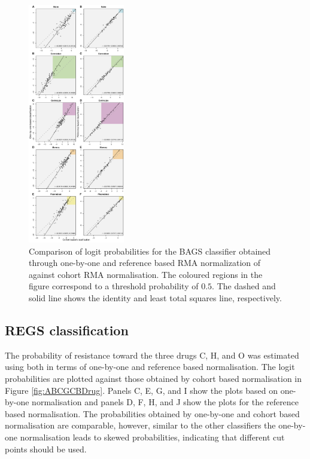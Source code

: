 \documentclass{article}
\begin{document}
\begin{figure}
\begin{center}
\includegraphics[width=0.375\textwidth]{figures/figure3.pdf}
\end{center}
\caption{Comparison of logit probabilities for the BAGS classifier obtained through one-by-one and reference based RMA normalization of \hemaClass{} against cohort RMA normalisation.
The coloured regions in the figure correspond to a threshold probability of $0.5$. The dashed and solid line shows the identity and least total squares line, respectively.}
\label{fig:Bagscorr}
\end{figure}
\newpage


\subsection{REGS classification}

The probability of resistance toward the three drugs C, H, and O was estimated using \hemaClass{} both in terms of one-by-one and reference based normalisation.
The logit probabilities are plotted against those obtained by cohort based normalisation in Figure \ref{fig:ABCGCBDrug}.
Panels C, E, G, and I show the plots based on one-by-one normalisation and panels D, F, H, and J show the plots for the reference based normalisation.
The probabilities obtained by one-by-one and cohort based normalisation are comparable, however, similar to the other classifiers the one-by-one normalisation leads to skewed probabilities, indicating that different cut points should be used.
\end{document}
